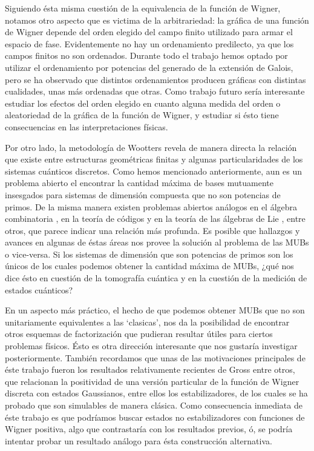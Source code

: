 \documentclass[a4paper]{report}
\begin{document}
  Siguiendo ésta misma cuestión de la equivalencia de la
  función de Wigner, notamos otro aspecto que es victima de
  la arbitrariedad: la gráfica de una función de Wigner
  depende del orden elegido del campo finito utilizado para
  armar el espacio de fase. Evidentemente no hay un
  ordenamiento predilecto, ya que los campos finitos no son
  ordenados. Durante todo el trabajo hemos optado por
  utilizar el ordenamiento por potencias del generado de la
  extensión de Galois, pero se ha observado que distintos
  ordenamientos producen gráficas con distintas cualidades,
  unas más ordenadas que otras. Como trabajo futuro sería
  interesante estudiar los efectos del orden elegido en
  cuanto alguna medida del orden o aleatoriedad de la
  gráfica de la función de Wigner, y estudiar si ésto tiene
  consecuencias en las interpretaciones físicas.

  Por otro lado, la metodología de Wootters revela de manera
  directa la relación que existe entre estructuras
  geométricas finitas y algunas particularidades de los
  sistemas cuánticos discretos. Como hemos mencionado
  anteriormente, aun es un problema abierto el encontrar la
  cantidad máxima de bases mutuamente insesgados para
  sistemas de dimensión compuesta que no son potencias de
  primos. De la misma manera existen problemas abiertos
  análogos en el álgebra combinatoria \cite{kantor2003}, en
  la teoría de códigos \cite{kantor1982} y en la teoría de
  las álgebras de Lie \cite{ivanov1987, kantor1996,
  boykin2005}, entre otros, que parece indicar una relación
  más profunda. Es posible que hallazgos y avances en
  algunas de éstas áreas nos provee la solución al problema
  de las MUBs o vice-versa. Si los sistemas de dimensión que
  son potencias de primos son los únicos de los cuales
  podemos obtener la cantidad máxima de MUBs, ¿qué nos dice
  ésto en cuestión de la tomografía cuántica y en la
  cuestión de la medición de estados cuánticos?

  En un aspecto más práctico, el hecho de que podemos
  obtener MUBs que no son unitariamente equivalentes a las
  `clasicas', nos da la posibilidad de encontrar otros
  esquemas de factorización que pudieran resultar útiles
  para ciertos problemas físicos. Ésto es otra dirección
  interesante que nos gustaría investigar posteriormente.
  También recordamos que unas de las motivaciones
  principales de éste trabajo fueron los resultados
  relativamente recientes de Gross \cite{gross2006} entre
  otros, que relacionan la positividad de una versión
  particular de la función de Wigner discreta con estados
  Gaussianos, entre ellos los estabilizadores, de los cuales
  se ha probado que son simulables de manera clásica. Como
  consecuencia inmediata de éste trabajo es que podríamos
  buscar estados no estabilizadores con funciones de Wigner
  positiva, algo que contrastaría con los resultados
  previos, ó, se podría intentar probar un resultado análogo
  para ésta construcción alternativa.

  \newpage
  \appendix
  

  \newpage
  \printbibliography
\end{document}
